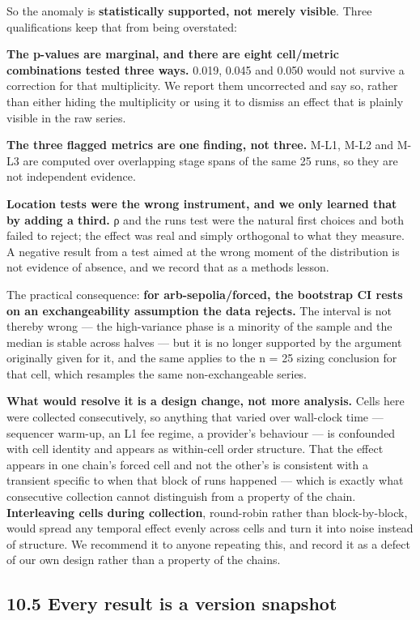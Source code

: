 \documentclass[conference]{IEEEtran}
\renewcommand{\_}{\textunderscore\allowbreak}
\begin{document}
So the anomaly is \textbf{statistically supported, not merely visible}.
Three qualifications keep that from being overstated:

\textbf{The p-values are marginal, and there are eight cell/metric
combinations tested three ways.} 0.019, 0.045 and 0.050 would not
survive a correction for that multiplicity. We report them uncorrected
and say so, rather than either hiding the multiplicity or using it to
dismiss an effect that is plainly visible in the raw series.

\textbf{The three flagged metrics are one finding, not three.} M-L1,
M-L2 and M-L3 are computed over overlapping stage spans of the same 25
runs, so they are not independent evidence.

\textbf{Location tests were the wrong instrument, and we only learned
that by adding a third.} ρ and the runs test were the natural first
choices and both failed to reject; the effect was real and simply
orthogonal to what they measure. A negative result from a test aimed at
the wrong moment of the distribution is not evidence of absence, and we
record that as a methods lesson.

The practical consequence: \textbf{for arb-sepolia/forced, the bootstrap
CI rests on an exchangeability assumption the data rejects.} The
interval is not thereby wrong --- the high-variance phase is a minority
of the sample and the median is stable across halves --- but it is no
longer supported by the argument originally given for it, and the same
applies to the n = 25 sizing conclusion for that cell, which resamples
the same non-exchangeable series.

\textbf{What would resolve it is a design change, not more analysis.}
Cells here were collected consecutively, so anything that varied over
wall-clock time --- sequencer warm-up, an L1 fee regime, a provider's
behaviour --- is confounded with cell identity and appears as
within-cell order structure. That the effect appears in one chain's
forced cell and not the other's is consistent with a transient specific
to when that block of runs happened --- which is exactly what
consecutive collection cannot distinguish from a property of the chain.
\textbf{Interleaving cells during collection}, round-robin rather than
block-by-block, would spread any temporal effect evenly across cells and
turn it into noise instead of structure. We recommend it to anyone
repeating this, and record it as a defect of our own design rather than
a property of the chains.

\subsection{10.5 Every result is a version
snapshot}\label{every-result-is-a-version-snapshot}
\end{document}
